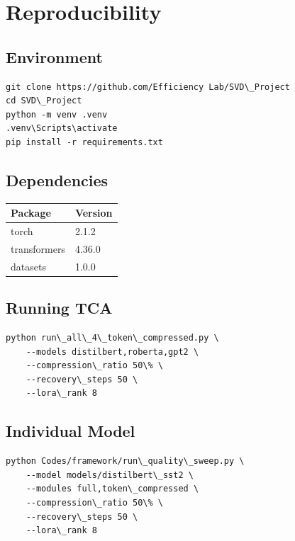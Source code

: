\section{Reproducibility}

\subsection{Environment}

\begin{lstlisting}
git clone https://github.com/Efficiency Lab/SVD\_Project
cd SVD\_Project
python -m venv .venv
.venv\Scripts\activate
pip install -r requirements.txt
\end{lstlisting}

\subsection{Dependencies}

\begin{table}[H]
\centering
\small
\begin{tabular}{ll}
\toprule
\textbf{Package} & \textbf{Version} \\
\midrule
torch & 2.1.2 \\
transformers & 4.36.0 \\
datasets & 1.0.0 \\
\bottomrule
\end{tabular}
\end{table}

\subsection{Running TCA}

\begin{lstlisting}
python run\_all\_4\_token\_compressed.py \
    --models distilbert,roberta,gpt2 \
    --compression\_ratio 50\% \
    --recovery\_steps 50 \
    --lora\_rank 8
\end{lstlisting}

\subsection{Individual Model}

\begin{lstlisting}
python Codes/framework/run\_quality\_sweep.py \
    --model models/distilbert\_sst2 \
    --modules full,token\_compressed \
    --compression\_ratio 50\% \
    --recovery\_steps 50 \
    --lora\_rank 8
\end{lstlisting}

